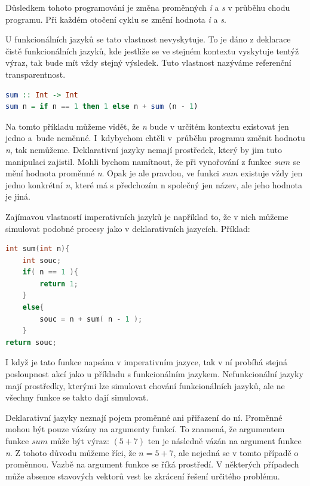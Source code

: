 \documentclass[12pt,a4paper]{report}
\begin{document}
Důsledkem tohoto programování je změna proměnných \textit{i} a \textit{s} v průběhu chodu programu. Při každém otočení cyklu se změní hodnota \textit{i} a \textit{s}.
 
U funkcionálních jazyků se tato vlastnost nevyskytuje. To je dáno z deklarace čistě funkcionálních jazyků, kde jestliže se ve stejném kontextu vyskytuje tentýž výraz, tak bude mít vždy stejný výsledek. %
Tuto vlastnost nazýváme referenční transparentnost.

\begin{lstlisting}[caption={jazyk Haskell}, captionpos=b, language=Haskell]	
sum :: Int -> Int
sum n = if n == 1 then 1 else n + sum (n - 1)
\end{lstlisting} 

\newpage
Na tomto příkladu můžeme vidět, že \textit{n} bude v určitém kontextu existovat jen jedno a~bude neměnné. I~kdybychom chtěli v~průběhu programu změnit hodnotu \textit{n}, tak nemůžeme. Deklarativní jazyky nemají prostředek, který by jim tuto manipulaci zajistil. Mohli bychom namítnout, že při vynořování z funkce $sum$ se mění hodnota proměnné \textit{n}. Opak je ale pravdou, ve funkci $sum$ existuje vždy jen jedno konkrétní \textit{n}, které má s předchozím n společný jen název, ale jeho hodnota je jiná.

Zajímavou vlastností imperativních jazyků je například to, že v nich můžeme simulovat podobné procesy jako v deklarativních jazycích. \newline
Příklad:

\begin{lstlisting}[caption={jazyk C}, captionpos=b, language = C]	
int sum(int n){
    int souc;
    if( n == 1 ){
        return 1;
    }
    else{
        souc = n + sum( n - 1 );
    }
return souc;
\end{lstlisting} 

I když je tato funkce napsána v imperativním jazyce, tak v ní probíhá stejná posloupnost akcí jako u příkladu s funkcionálním jazykem. Nefunkcionální jazyky mají prostředky, kterými lze simulovat chování funkcionálních jazyků, ale ne všechny funkce se takto dají simulovat. 

Deklarativní jazyky neznají pojem proměnné ani přiřazení do ní. Proměnné mohou být pouze vázány na argumenty funkcí. To znamená, že argumentem funkce $sum$ může být výraz: $(5 + 7)$ ten je následně vázán na argument funkce \textit{n}. Z tohoto důvodu můžeme říci, že $n = 5 + 7$, ale nejedná se v tomto případě o proměnnou. Vazbě na argument funkce se říká prostředí. V některých případech může absence stavových vektorů vest ke zkrácení řešení určitého problému.
\end{document}
